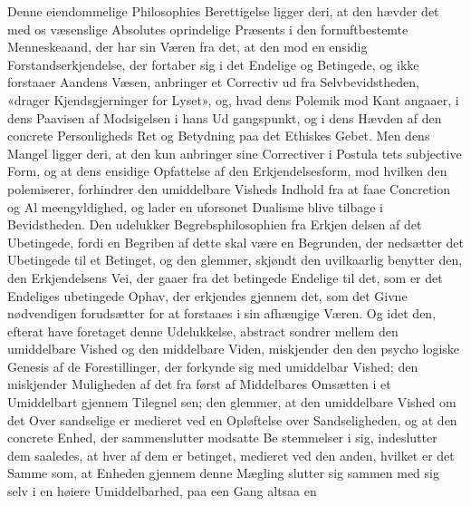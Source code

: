 \documentclass[12pt,a4paper]{book}
\begin{document}
Denne eiendommelige Philosophies Berettigelse ligger deri,
at den hævder det med os væsenslige Absolutes oprindelige
Præsents i den fornuftbestemte Menneskeaand, der har sin
Væren fra det, at den mod en ensidig Forstandserkjendelse,
der fortaber sig i det Endelige og Betingede, og ikke forstaaer
Aandens Væsen, anbringer et Correctiv ud fra Selvbevidstheden,
«drager Kjendsgjerninger for Lyset», og, hvad dens Polemik
mod Kant angaaer, i dens Paavisen af Modsigelsen i hans Ud\-%
gangspunkt, og i dens Hævden af den concrete Personligheds
Ret og Betydning paa det Ethiskes Gebet. Men dens Mangel
ligger deri, at den kun anbringer sine Correctiver i Postula\-%
tets subjective Form, og at dens ensidige Opfattelse af den
Erkjendelsesform, mod hvilken den polemiserer, forhindrer den
umiddelbare Visheds Indhold fra at faae Concretion og Al\-%
meengyldighed, og lader en uforsonet Dualisme blive tilbage i
Bevidstheden. Den udelukker Begrebsphilosophien fra Erkjen\-%
delsen af det Ubetingede, fordi en Begriben af dette skal være
en Begrunden, der nedsætter det Ubetingede til et Betinget,
og den glemmer, skjøndt den uvilkaarlig benytter den, den
Erkjendelsens Vei, der gaaer fra det betingede Endelige til det,
som er det Endeliges ubetingede Ophav, der erkjendes gjennem
det, som det Givne nødvendigen forudsætter for at forstaaes i
\setcounter{footnote}{0}%
sin afhængige Væren. Og idet den, efterat have foretaget
denne Udelukkelse, abstract sondrer mellem den umiddelbare
Vished og den middelbare Viden, miskjender den den psycho\-%
logiske Genesis af de Forestillinger, der forkynde sig med
umiddelbar Vished; den miskjender Muligheden af det fra først
af Middelbares Omsætten i et Umiddelbart gjennem Tilegnel\-%
sen; den glemmer, at den umiddelbare Vished om det Over\-%
sandselige er medieret ved en Opløftelse over Sandseligheden,
og at den concrete Enhed, der sammenslutter modsatte Be\-%
stemmelser i sig, indeslutter dem saaledes, at hver af dem er
betinget, medieret ved den anden, hvilket er det Samme som,
at Enheden gjennem denne Mægling slutter sig sammen med
sig selv i en høiere Umiddelbarhed, paa een Gang altsaa en
\end{document}
